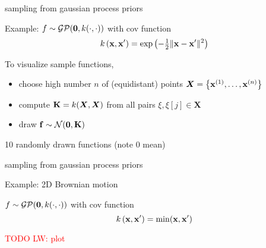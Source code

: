 \documentclass[11pt,compress,t,notes=noshow, xcolor=table]{beamer}
\begin{document}
\begin{framei}[sep=L]{sampling from gaussian process priors}
\item Example: $f \sim \mathcal{GP}(\mathbf{0}, k(\cdot, \cdot))$ with cov function
$$ k\left(\mathbf{x}, \mathbf{x}^{\prime} \right) = \exp\left(-\tfrac{1}{2}\|\mathbf{x} - \mathbf{x}^\prime\|^2\right)$$
\item To visualize sample functions, 
\begin{itemize}
\item choose high number $n$ of (equidistant) points $\bm{X} = \left\{ \mathbf{x}^{(1)}, \ldots, \mathbf{x}^{(n)}\right\}$
  \item compute $\mathbf{K} = k(\bm{X}, \bm{X})$ from all pairs $\xi, \xi[j] \in \bm{X}$ 
  \item draw $\mathbf{f} \sim \mathcal{N}(\mathbf{0}, \mathbf{K})$ 
\end{itemize}
\item 10 randomly drawn functions (note 0 mean)
\vfill
{}
\end{framei}

\begin{framei}[sep=L]{sampling from gaussian process priors}
\item Example: 2D Brownian motion
\item $f \sim \mathcal{GP}(\mathbf{0}, k(\cdot, \cdot))$ with cov function
$$ k\left(\mathbf{x}, \mathbf{x}^{\prime} \right) = \min (\mathbf{x}, \mathbf{x}^\prime)$$
\item \textcolor{red}{TODO LW: plot}
\end{framei}

\endlecture
\end{document}
